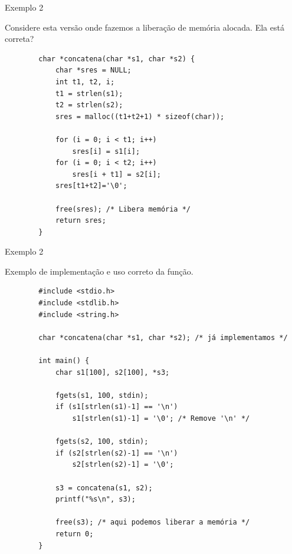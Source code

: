 \documentclass[handout]{beamer}
\begin{document}
\begin{frame}[fragile]{Exemplo 2}

    Considere esta versão onde fazemos a liberação de memória alocada. Ela está correta?

    \begin{verbatim}
        char *concatena(char *s1, char *s2) {
            char *sres = NULL;
            int t1, t2, i;
            t1 = strlen(s1);
            t2 = strlen(s2);
            sres = malloc((t1+t2+1) * sizeof(char));

            for (i = 0; i < t1; i++)
                sres[i] = s1[i];
            for (i = 0; i < t2; i++)
                sres[i + t1] = s2[i];
            sres[t1+t2]='\0';

            free(sres); /* Libera memória */
            return sres;
        }
    \end{verbatim}

\end{frame}

\begin{frame}[fragile]{Exemplo 2}

    Exemplo de implementação e uso correto da função.
    \vspace{-0.3cm}
    \begin{verbatim}
        #include <stdio.h>
        #include <stdlib.h>
        #include <string.h>

        char *concatena(char *s1, char *s2); /* já implementamos */

        int main() {
            char s1[100], s2[100], *s3;

            fgets(s1, 100, stdin);
            if (s1[strlen(s1)-1] == '\n')
                s1[strlen(s1)-1] = '\0'; /* Remove '\n' */

            fgets(s2, 100, stdin);
            if (s2[strlen(s2)-1] == '\n')
                s2[strlen(s2)-1] = '\0';
  
            s3 = concatena(s1, s2);
            printf("%s\n", s3);

            free(s3); /* aqui podemos liberar a memória */
            return 0;
        }
    \end{verbatim}

\end{frame}

\end{document}
